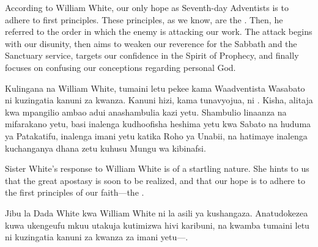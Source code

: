 According to William White, our only hope as Seventh-day Adventists is to adhere to first principles. These principles, as we know, are the . Then, he referred to the order in which the enemy is attacking our work. The attack begins with our disunity, then aims to weaken our reverence for the Sabbath and the Sanctuary service, targets our confidence in the Spirit of Prophecy, and finally focuses on confusing our conceptions regarding personal God.


Kulingana na William White, tumaini letu pekee kama Waadventista Wasabato ni kuzingatia kanuni za kwanza. Kanuni hizi, kama tunavyojua, ni . Kisha, alitaja kwa mpangilio ambao adui anashambulia kazi yetu. Shambulio linaanza na mifarakano yetu, basi inalenga kudhoofisha heshima yetu kwa Sabato na huduma ya Patakatifu, inalenga imani yetu katika Roho ya Unabii, na hatimaye inalenga kuchanganya dhana zetu kuhusu Mungu wa kibinafsi.


Sister White’s response to William White is of a startling nature. She hints to us that the great apostasy is soon to be realized, and that our hope is to adhere to the first principles of our faith—the .


Jibu la Dada White kwa William White ni la asili ya kushangaza. Anatudokezea kuwa ukengeufu mkuu utakuja kutimizwa hivi karibuni, na kwamba tumaini letu ni kuzingatia kanuni za kwanza za imani yetu—.


 \\
 \\
 \\


 \\
 \\
 \\






